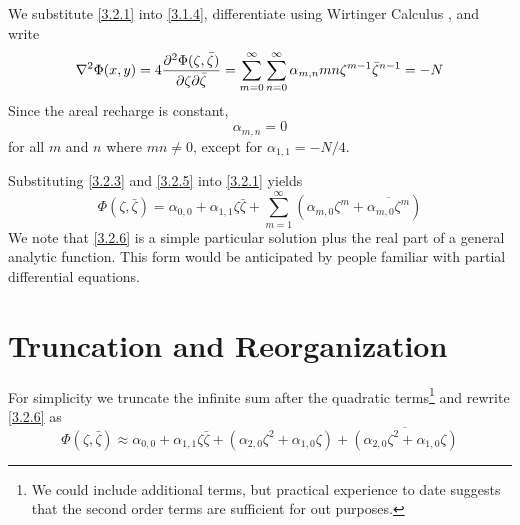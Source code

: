 \documentclass[12pt]{report}
\providecommand{\pqderiv}[3]{\frac{\mathinner{\partial^2#1}}{\mathinner{\partial#2\partial#3}}}
\begin{document}
We substitute \eqref{3.2.1} into \eqref{3.1.4}, differentiate using Wirtinger Calculus \citep[(8.68)]{Strack2017}, and write
%
\begin{equation}\label{3.2.4}
    \nabla^2 \Phi(x,y)
    = 4 \pqderiv{\Phi(\zeta, \bar{\zeta})}{\zeta}{\bar{\zeta}}
    = \sum_{m=0}^{\infty} \sum_{n=0}^{\infty} \alpha_{m,n} m n \zeta^{m-1} \bar{\zeta}^{n-1}
    = -N
\end{equation}
%
Since the areal recharge is constant,
%
\begin{equation}\label{3.2.5}
    \alpha_{m,n} = 0
\end{equation}
%
for all $m$ and $n$ where $mn \neq 0$, except for $\alpha_{1,1} = -N/4$.

Substituting \eqref{3.2.3} and \eqref{3.2.5} into \eqref{3.2.1} yields
%
\begin{equation}\label{3.2.6}
    \Phi(\zeta, \bar{\zeta}) = \alpha_{0,0} + \alpha_{1,1} \zeta \bar{\zeta} + \sum_{m=1}^{\infty} \left( \alpha_{m,0} \zeta^m + \overline{\alpha_{m,0} \zeta^m} \right)
\end{equation}
%
We note that \eqref{3.2.6} is a simple particular solution plus the real part of a general analytic function. This form would be anticipated by people familiar with partial differential equations.

\section{Truncation and Reorganization}
For simplicity we truncate the infinite sum after the quadratic terms\footnote{We could include additional terms, but practical experience to date suggests that the second order terms are sufficient for out purposes.} and rewrite \eqref{3.2.6} as
%
\begin{equation}\label{3.3.1}
    \Phi(\zeta, \bar{\zeta}) \approx
        \alpha_{0,0} + \alpha_{1,1} \zeta \bar{\zeta} +
        \left( \alpha_{2,0} \zeta^2 + \alpha_{1,0} \zeta \right) +
        \overline{\left( \alpha_{2,0} \zeta^2 + \alpha_{1,0} \zeta \right)}
\end{equation}

\end{document}
